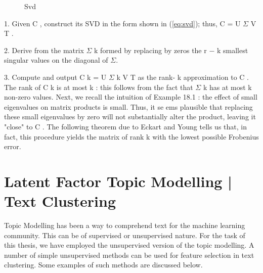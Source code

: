\begin{figure}[H]
    {\par}
    \caption{Svd}
    \label{eq:svd}
\end{figure}


1. Given C , construct its SVD in the form shown in (\eqref{eq:svd}); thus, C = U $\Sigma$ V T .

2. Derive from  the matrix $\Sigma$ k formed by replacing by zeros the r − k smallest singular values on the diagonal of $\Sigma$.

3. Compute and output C k = U $\Sigma$ k V T as the rank- k approximation to C . The rank of C k is at most k :  this follows from the fact that $\Sigma$ k has at most k non-zero values.  Next, we recall the intuition of Example 18.1 :  the effect of small eigenvalues on matrix products is small.  Thus, it se ems plausible that replacing these small eigenvalues by zero will not substantially alter the product, leaving it "close" to C .  The following theorem due to Eckart and Young tells us that, in fact, this procedure yields the matrix of rank k with the lowest possible Frobenius error.

\section{Latent Factor Topic Modelling | Text Clustering}

Topic Modelling has been a way to comprehend text for the machine learning community. This can be of supervised or unsupervised nature. For the task of this thesis, we have employed the unsupervised version of the topic modelling. A number of simple unsupervised methods can be used for feature selection in text clustering. Some examples of such methods are discussed below.

